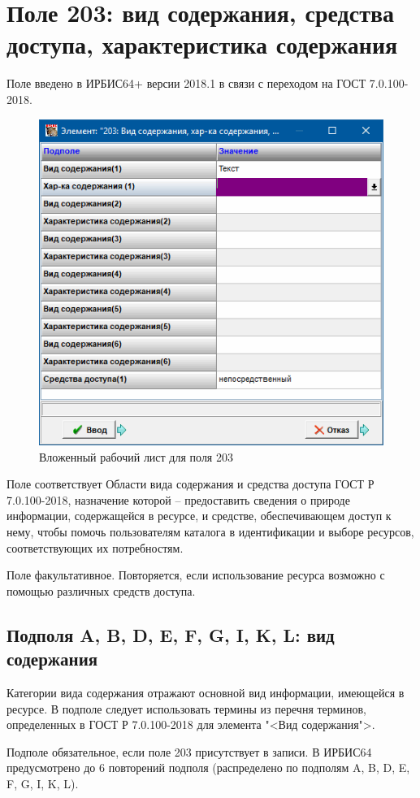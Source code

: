 \chapter{Поле 203: вид содержания, средства доступа, характеристика содержания}

Поле введено в ИРБИС64+ версии 2018.1 в связи с переходом на ГОСТ 7.0.100-2018.

\begin{figure}
    \centering
    \includegraphics[width=0.7\linewidth]{img/field203}
    \caption[Вложенный рабочий лист для поля 203]{Вложенный рабочий лист для поля 203}
    \label{fig:field203}
\end{figure}

Поле соответствует Области вида содержания и средства доступа ГОСТ Р 7.0.100-2018, назначение которой -- предоставить сведения о природе информации, содержащейся в ресурсе, и средстве, обеспечивающем доступ к нему, чтобы помочь пользователям каталога в идентификации и выборе ресурсов, соответствующих их потребностям.

Поле факультативное. Повторяется, если использование ресурса возможно с помощью различных средств доступа.

\section{Подполя A, B, D, E, F, G, I, K, L: вид содержания}

Категории вида содержания отражают основной вид информации, имеющейся в ресурсе. В подполе следует использовать термины из перечня терминов, определенных в ГОСТ Р 7.0.100-2018 для элемента "<Вид содержания">.

Подполе обязательное, если поле 203 присутствует в записи. В ИРБИС64 предусмотрено до 6 повторений подполя (распределено по подполям A, B, D, E, F, G, I, K, L).

